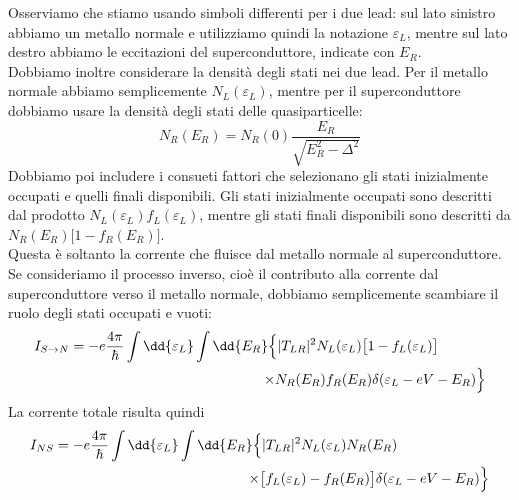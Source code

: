 Osserviamo che stiamo usando simboli differenti per i due lead: sul lato sinistro abbiamo un metallo normale e utilizziamo quindi la notazione $\varepsilon_L$, mentre sul lato destro abbiamo le eccitazioni del superconduttore, indicate con $E_R$.\\
Dobbiamo inoltre considerare la densità degli stati nei due lead. Per il metallo normale abbiamo semplicemente $N_L(\varepsilon_L)$, mentre per il superconduttore dobbiamo usare la densità degli stati delle quasiparticelle:
\begin{equation*}
    N_R(E_R)
    =
    N_R(0)
    \frac{
        E_R
    }{
        \sqrt{
            E_R^2-\Delta^2
        }
    }
\end{equation*}
Dobbiamo poi includere i consueti fattori che selezionano gli stati inizialmente occupati e quelli finali disponibili. Gli stati inizialmente occupati sono descritti dal prodotto $N_L(\varepsilon_L)
f_L(\varepsilon_L)$, mentre gli stati finali disponibili sono descritti da $N_R(E_R) \bigl[ 1-f_R(E_R) \bigr]$.\\
Questa è soltanto la corrente che fluisce dal metallo normale al superconduttore. Se consideriamo il processo inverso, cioè il contributo alla corrente dal superconduttore verso il metallo normale, dobbiamo semplicemente scambiare il ruolo degli stati occupati e vuoti:
\begin{equation*}
    \begin{split}
        I_{S \to N}
        &=
        -e
        \frac{4\pi}{\hbar}
        \int
        \dd{\varepsilon_L}
        \int
        \dd{E_R}
        \Bigl\{
            |T_{LR}|^2
            N_L(\varepsilon_L)
            \bigl[
                1-f_L(\varepsilon_L)
            \bigr]
        \Bigr.
        \\
        & \hphantom{=
        -e
        \frac{4\pi}{\hbar}
        \int
        \dd{\varepsilon_L}
        \int
        \dd{E_R}}
        \Bigl.
        \times
        N_R(E_R)
        f_R(E_R)
        \delta(
            \varepsilon_L-eV-E_R
        )
        \Bigr\}
    \end{split}
\end{equation*}
La corrente totale risulta quindi
\begin{equation*}
    \begin{split}
        I_{NS}
        &=
        -e
        \frac{4\pi}{\hbar}
        \int
        \dd{\varepsilon_L}
        \int
        \dd{E_R}
        \Bigl\{
            |T_{LR}|^2
            N_L(\varepsilon_L)
            N_R(E_R)
        \Bigr.
        \\
        & \hphantom{=
        -e
        \frac{4\pi}{\hbar}
        \int
        \dd{\varepsilon_L}
        \int
        \dd{E_R}}
        \Bigl.
        \times
        \bigl[
            f_L(\varepsilon_L)
            -
            f_R(E_R)
        \bigr]
        \delta(
            \varepsilon_L-eV-E_R
        )
        \Bigr\}
    \end{split}
\end{equation*}
